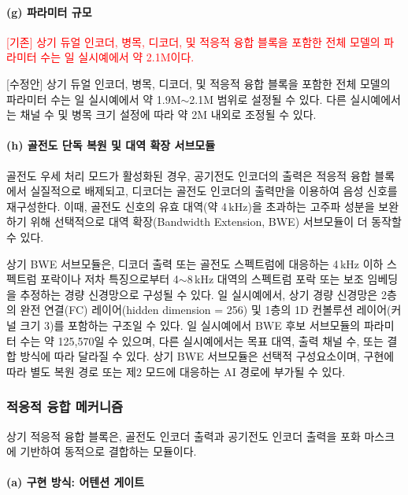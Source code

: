 \documentclass{article}
\newcommand{\reviewold}[1]{{\par\noindent\textcolor{red}{[기존] #1}}}
\newcommand{\reviewnew}[1]{{\par\noindent\textcolor{customblue}{[수정안] #1}}}
\newcommand{\reviewpair}[2]{\reviewold{#1}\reviewnew{#2}\par}
\DeclareRobustCommand{\codexedit}[1]{\textcolor{customorange}{#1}}
\DeclareRobustCommand{\vtwoedit}[1]{\textcolor{customgreen}{#1}}
\begin{document}
\paragraph{(g) 파라미터 규모}

\reviewpair{상기 듀얼 인코더, 병목, 디코더, 및 적응적 융합 블록을 포함한 전체 모델의 파라미터 수는 일 실시예에서 약 2.1M이다.}{\vtwoedit{상기 듀얼 인코더, 병목, 디코더, 및 적응적 융합 블록을 포함한 전체 모델의 파라미터 수는 일 실시예에서 약 1.9M$\sim$2.1M 범위로 설정될 수 있다. 다른 실시예에서는 채널 수 및 병목 크기 설정에 따라 약 2M 내외로 조정될 수 있다.}}

\paragraph{(h) 골전도 단독 복원 및 대역 확장 서브모듈}

\codexedit{골전도 우세 처리 모드가 활성화된 경우, 공기전도 인코더의 출력은 적응적 융합 블록에서 실질적으로 배제되고, 디코더는 골전도 인코더의 출력만을 이용하여 음성 신호를 재구성한다. 이때, 골전도 신호의 유효 대역(약 4\,kHz)을 초과하는 고주파 성분을 보완하기 위해 선택적으로 대역 확장(Bandwidth Extension, BWE) 서브모듈이 더 동작할 수 있다.}

\codexedit{상기 BWE 서브모듈은, 디코더 출력 또는 골전도 스펙트럼에 대응하는 4\,kHz 이하 스펙트럼 포락이나 저차 특징으로부터 4$\sim$8\,kHz 대역의 스펙트럼 포락 또는 보조 임베딩을 추정하는 경량 신경망으로 구성될 수 있다. 일 실시예에서, 상기 경량 신경망은 2층의 완전 연결(FC) 레이어(hidden dimension = 256) 및 1층의 1D 컨볼루션 레이어(커널 크기 3)를 포함하는 구조일 수 있다. 일 실시예에서 BWE 후보 서브모듈의 파라미터 수는 약 125,570일 수 있으며, 다른 실시예에서는 목표 대역, 출력 채널 수, 또는 결합 방식에 따라 달라질 수 있다. 상기 BWE 서브모듈은 선택적 구성요소이며, 구현에 따라 별도 복원 경로 또는 제2 모드에 대응하는 AI 경로에 부가될 수 있다.}

\subsubsection{적응적 융합 메커니즘}

상기 적응적 융합 블록은, 골전도 인코더 출력과 공기전도 인코더 출력을 포화 마스크에 기반하여 동적으로 결합하는 모듈이다.

\paragraph{(a) 구현 방식: 어텐션 게이트}
\end{document}
